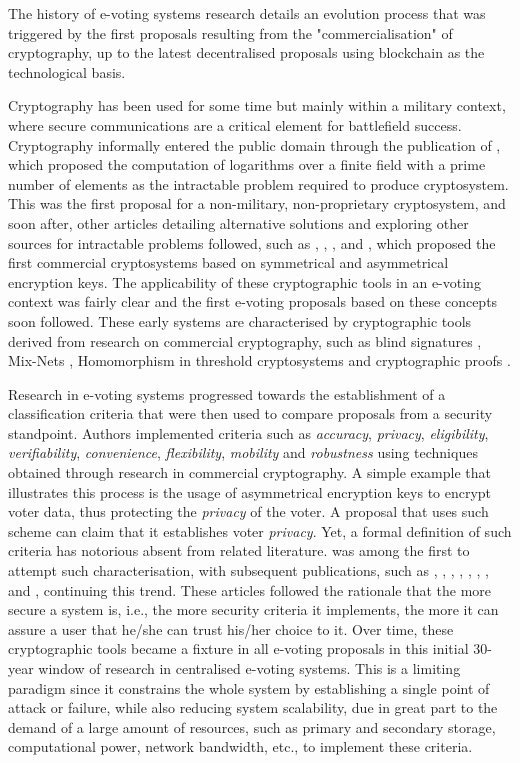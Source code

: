 \documentclass[../main.tex]{subfiles}
\begin{document}
    The history of e-voting systems research details an evolution process that was triggered by the first proposals resulting from the "commercialisation" of cryptography, up to the latest decentralised proposals using blockchain as the technological basis.
    \par
    Cryptography has been used for some time but mainly within a military context, where secure communications are a critical element for battlefield success. Cryptography informally entered the public domain through the publication of \cite{Diffie1976}, which proposed the computation of logarithms over a finite field with a prime number of elements as the intractable problem required to produce cryptosystem. This was the first proposal for a non-military, non-proprietary cryptosystem, and soon after, other articles detailing alternative solutions and exploring other sources for intractable problems followed, such as \cite{Shamir1979}, \cite{Chaum1981}, \cite{ElGamal1984}, and \cite{Rivest1983}, which proposed the first commercial cryptosystems based on symmetrical and asymmetrical encryption keys. The applicability of these cryptographic tools in an e-voting context was fairly clear and the first e-voting proposals based on these concepts soon followed. These early systems are characterised by cryptographic tools derived from research on commercial cryptography, such as blind signatures \cite{Chaum1983}, Mix-Nets \cite{Chaum1988}, Homomorphism in threshold cryptosystems \cite{Shamir1979} and cryptographic proofs \cite{Goldwasser1986}.
    \par
    Research in e-voting systems progressed towards the establishment of a classification criteria that were then used to compare proposals from a security standpoint. Authors implemented criteria such as \textit{accuracy}, \textit{privacy}, \textit{eligibility}, \textit{verifiability}, \textit{convenience}, \textit{flexibility}, \textit{mobility} and \textit{robustness} using techniques obtained through research in commercial cryptography. A simple example that illustrates this process is the usage of asymmetrical encryption keys to encrypt voter data, thus protecting the \textit{privacy} of the voter. A proposal that uses such scheme can claim that it establishes voter \textit{privacy}. Yet, a formal definition of such criteria has notorious absent from related literature. \cite{Neumann1993} was among the first to attempt such characterisation, with subsequent publications, such as \cite{Fujioka1992}, \cite{Baraani1995}, \cite{Juang1997}, \cite{Ku1999}, \cite{Lee2000}, \cite{Joaquim2003}, \cite{Baiardi2005}, and \cite{Chaum2007}, continuing this trend. These articles followed the rationale that the more secure a system is, i.e., the more security criteria it implements, the more it can assure a user that he/she can trust his/her choice to it. Over time, these cryptographic tools became a fixture in all e-voting proposals in this initial 30-year window of research in centralised e-voting systems. This is a limiting paradigm since it constrains the whole system by establishing a single point of attack or failure, while also reducing system scalability, due in great part to the demand of a large amount of resources, such as primary and secondary storage, computational power, network bandwidth, etc., to implement these criteria.
\end{document}
